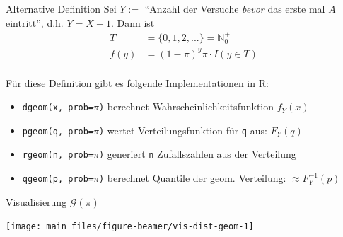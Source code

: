 \documentclass[
  10pt,
  ignorenonframetext,
]{beamer}
\providecommand{\tightlist}{%
  \setlength{\itemsep}{0pt}\setlength{\parskip}{0pt}}
\begin{document}
\begin{frame}[fragile]{Alternative Definition}
\label{alternative-definition}
Sei \(Y:=\) ``Anzahl der Versuche \emph{bevor} das erste mal \(A\)
eintritt'', d.h. \(Y=X-1\). Dann ist \begin{align*}
T & =  \{0, 1, 2, ... \} = \mathbb{N}_0^+\\
f(y) & =  (1 - \pi)^y  \pi \cdot I(y \in T)
\end{align*}\\

Für diese Definition gibt es folgende Implementationen in R:

\begin{itemize}
\tightlist
\item
  \texttt{dgeom(x,\ prob=}\(\pi\)\texttt{)} berechnet
  Wahrscheinlichkeitsfunktion \(f_Y(x)\)
\item
  \texttt{pgeom(q,\ prob=}\(\pi\)\texttt{)} wertet Verteilungsfunktion
  für \texttt{q} aus: \(F_Y(q)\)
\item
  \texttt{rgeom(n,\ prob=}\(\pi\)\texttt{)} generiert \texttt{n}
  Zufallszahlen aus der Verteilung
\item
  \texttt{qgeom(p,\ prob=}\(\pi\)\texttt{)} berechnet Quantile der geom.
  Verteilung: \(\approx F_Y^{-1}(p)\)
\end{itemize}
\end{frame}

\begin{frame}{Visualisierung \({\mathcal G}(\pi)\)}
\label{visualisierung-mathcal-gpi}
\scriptsize

\begin{center}\texttt{[image: main\_files/figure-beamer/vis-dist-geom-1]} \end{center}

\normalsize
\end{frame}
\end{document}

